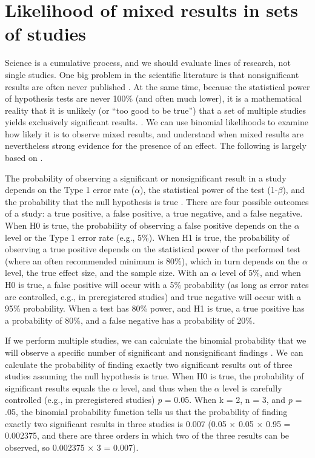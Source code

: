 \documentclass[
]{krantz}
\begin{document}
\hypertarget{likelihood-of-mixed-results-in-sets-of-studies}{%
\section{Likelihood of mixed results in sets of studies}\label{likelihood-of-mixed-results-in-sets-of-studies}}

Science is a cumulative process, and we should evaluate lines of research, not single studies. One big problem in the scientific literature is that nonsignificant results are often never published \citep{franco_publication_2014, fanelli_positive_2010}. At the same time, because the statistical power of hypothesis tests are never 100\% (and often much lower), it is a mathematical reality that it is unlikely (or ``too good to be true'') that a set of multiple studies yields exclusively significant results. \citep{schimmack_ironic_2012, francis_frequency_2014}. We can use binomial likelihoods to examine how likely it is to observe mixed results, and understand when mixed results are nevertheless strong evidence for the presence of an effect. The following is largely based on \citet{lakens_too_2017}.

The probability of observing a significant or nonsignificant result in a study depends on the Type 1 error rate (\(\alpha\)), the statistical power of the test (1-\(\beta\)), and the probability that the null hypothesis is true \citep{wacholder_assessing_2004}. There are four possible outcomes of a study: a true positive, a false positive, a true negative, and a false negative. When H0 is true, the probability of observing a false positive depends on the \(\alpha\) level or the Type 1 error rate (e.g., 5\%). When H1 is true, the probability of observing a true positive depends on the statistical power of the performed test (where an often recommended minimum is 80\%), which in turn depends on the \(\alpha\) level, the true effect size, and the sample size. With an \(\alpha\) level of 5\%, and when H0 is true, a false positive will occur with a 5\% probability (as long as error rates are controlled, e.g., in preregistered studies) and true negative will occur with a 95\% probability. When a test has 80\% power, and H1 is true, a true positive has a probability of 80\%, and a false negative has a probability of 20\%.

If we perform multiple studies, we can calculate the binomial probability that we will observe a specific number of significant and nonsignificant findings \citep{ioannidis_exploratory_2007}. We can calculate the probability of finding exactly two significant results out of three studies assuming the null hypothesis is true. When H0 is true, the probability of significant results equals the \(\alpha\) level, and thus when the \(\alpha\) level is carefully controlled (e.g., in preregistered studies) \emph{p} = 0.05. When k = 2, n = 3, and \emph{p} = .05, the binomial probability function tells us that the probability of finding exactly two significant results in three studies is 0.007 (0.05 × 0.05 × 0.95 = 0.002375, and there are three orders in which two of the three results can be observed, so 0.002375 × 3 = 0.007).
\end{document}
